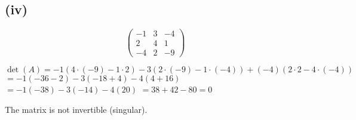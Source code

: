 \subsection*{(iv)}
\[
	\begin{pmatrix}
		-1 & 3 & -4 \\
		2  & 4 & 1  \\
		-4 & 2 & -9
	\end{pmatrix}
\]

$\det(A) = -1(4 \cdot (-9) - 1 \cdot 2) - 3(2 \cdot (-9) - 1 \cdot (-4)) + (-4)(2 \cdot 2 - 4 \cdot (-4))$
$= -1(-36 - 2) - 3(-18 + 4) - 4(4 + 16)$
$= -1(-38) - 3(-14) - 4(20)$
$= 38 + 42 - 80 = 0$

The matrix is not invertible (singular).